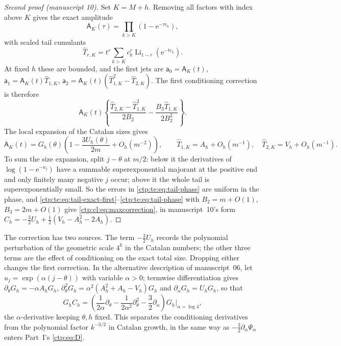 \documentclass[11pt,a4paper]{article}
\numberwithin{equation}{section}
\theoremstyle{definition}
\theoremstyle{remark}
\newcommand{\e}{\mathrm e}
\DeclareMathOperator{\Li}{Li}
\newcommand{\amp}{\mathsf A}
\begin{document}
\begin{proof}[Second proof (manuscript 10)]
Set $K=M+h$. Removing all factors with index above $K$ gives the exact
amplitude
\begin{equation}\label{ctp:te:eq:tail-amp}
 \amp_K(\tau)=\prod_{k>K}(1-\e^{-\tau c_k}),
\end{equation}
with scaled tail cumulants
\begin{equation}\label{ctp:te:eq:Tr}
 \widehat T_{r,K}=t^r\sum_{k>K}c_k^r\Li_{1-r}(\e^{-tc_k}).
\end{equation}
At fixed $h$ these are bounded, and the first jets are
$\mathsf a_0=\amp_K(t)$, $\mathsf a_1=\amp_K(t)\widehat T_{1,K}$,
$\mathsf a_2=\amp_K(t)(\widehat T_{1,K}^2-\widehat T_{2,K})$. The first
conditioning correction is therefore
\begin{equation}\label{ctp:te:eq:tail-exact-first}
 \amp_K(t)\left\{\frac{\widehat T_{2,K}-\widehat T_{1,K}^2}{2B_2}
 -\frac{B_3\widehat T_{1,K}}{2B_2^2}\right\}.
\end{equation}
The local expansion of the Catalan sizes gives
\begin{equation}\label{ctp:te:eq:tail-phase}
 \amp_K(t)=G_h(\theta)\left(1-\frac{3U_h(\theta)}{2m}+O_h(m^{-2})\right),\qquad
 \widehat T_{1,K}=A_h+O_h(m^{-1}),\quad \widehat T_{2,K}=V_h+O_h(m^{-1}).
\end{equation}
To sum the size expansion, split $j-\theta$ at $m/2$: below it the
derivatives of $\log(1-\e^{-u_j})$ have a summable superexponential majorant
at the positive end and only finitely many negative $j$ occur; above it the
whole tail is superexponentially small. So the errors in
\eqref{ctp:te:eq:tail-phase} are uniform in the phase, and
\eqref{ctp:te:eq:tail-exact-first}--\eqref{ctp:te:eq:tail-phase} with
$B_2=m+O(1)$, $B_3=2m+O(1)$ give \eqref{ctp:cl:eq:maxcorrection}, in
manuscript~10's form $C_h=-\frac32U_h+\frac12(V_h-A_h^2-2A_h)$.
\end{proof}

The correction has two sources. The term $-\frac32U_h$ records the
polynomial perturbation of the geometric scale $4^k$ in the Catalan numbers;
the other three terms are the effect of conditioning on the exact total
size. Dropping either changes the first correction. In the alternative
description of manuscript~06, let $u_j=\exp(\alpha(j-\theta))$ with
variable $\alpha>0$; termwise differentiation gives
$\partial_\theta G_h=-\alpha A_hG_h$,
$\partial_\theta^2G_h=\alpha^2(A_h^2+A_h-V_h)G_h$ and
$\partial_\alpha G_h=U_hG_h$, so that
\begin{equation}\label{ctp:cl:eq:differentialcorrection}
 G_hC_h=\left(\frac1{2\alpha}\partial_\theta-\frac1{2\alpha^2}\partial_\theta^2
 -\frac32\partial_\alpha\right)G_h\Big|_{\alpha=\log4},
\end{equation}
the $\alpha$-derivative keeping $\theta,h$ fixed. This separates the
conditioning derivatives from the polynomial factor $k^{-3/2}$ in Catalan
growth, in the same way as $-\frac32\partial_\alpha\Psi_\alpha$ enters
Part~I's \eqref{ctp:eq:D}.
\end{document}
